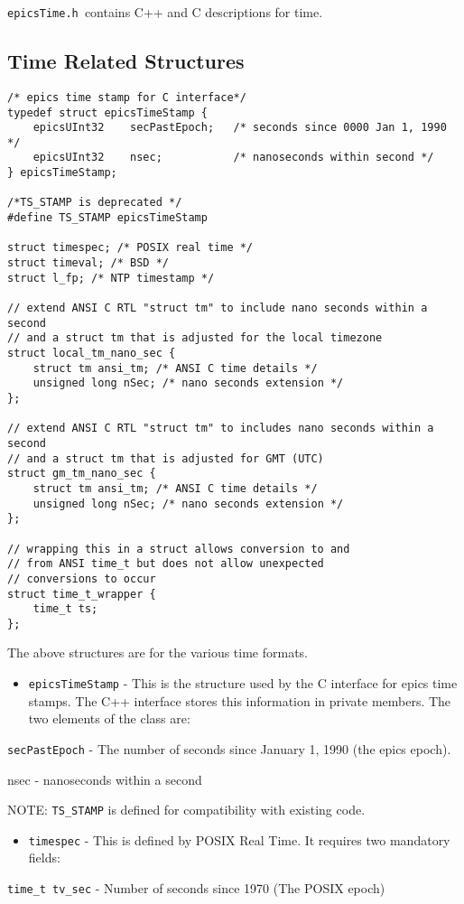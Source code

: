 \verb|epicsTime.h |contains C++ and C descriptions for time.

\subsection{Time Related Structures}

\begin{verbatim}/* epics time stamp for C interface*/
typedef struct epicsTimeStamp {
    epicsUInt32    secPastEpoch;   /* seconds since 0000 Jan 1, 1990 */
    epicsUInt32    nsec;           /* nanoseconds within second */
} epicsTimeStamp;

/*TS_STAMP is deprecated */
#define TS_STAMP epicsTimeStamp

struct timespec; /* POSIX real time */
struct timeval; /* BSD */
struct l_fp; /* NTP timestamp */

// extend ANSI C RTL "struct tm" to include nano seconds within a second
// and a struct tm that is adjusted for the local timezone
struct local_tm_nano_sec {
    struct tm ansi_tm; /* ANSI C time details */
    unsigned long nSec; /* nano seconds extension */
};

// extend ANSI C RTL "struct tm" to includes nano seconds within a second
// and a struct tm that is adjusted for GMT (UTC)
struct gm_tm_nano_sec {
    struct tm ansi_tm; /* ANSI C time details */
    unsigned long nSec; /* nano seconds extension */
};

// wrapping this in a struct allows conversion to and
// from ANSI time_t but does not allow unexpected
// conversions to occur
struct time_t_wrapper {
    time_t ts;
};
\end{verbatim}

The above structures are for the various time formats.

\begin{itemize}\item \verb|epicsTimeStamp| - This is the structure used by the C interface for epics time stamps. The C++ interface stores 
this information in private members. The two elements of the class are:

\end{itemize}\verb|secPastEpoch| - The number of seconds since January 1, 1990 (the epics epoch).

nsec - nanoseconds within a second

\begin{description}\item NOTE: \verb|TS_STAMP| is defined for compatibility with existing code.

\end{description}\begin{itemize}\item \verb|timespec| - This is defined by POSIX Real Time. It requires two mandatory fields:

\end{itemize}\verb|time_t tv_sec| - Number of seconds since 1970 (The POSIX epoch)


